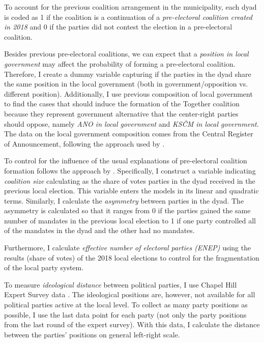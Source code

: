 \documentclass[fignum,12pt,titlepage]{article}
\begin{document}
To account for the previous coalition arrangement in the municipality, each dyad is coded as 1 if the coalition is a continuation of a \emph{pre-electoral coalition created in 2018} and 0 if the parties did not contest the election in a pre-electoral coalition. 

Besides previous pre-electoral coalitions, we can expect that a \emph{position in local government} may affect the probability of forming a pre-electoral coalition. Therefore, I create a dummy variable capturing if the parties in the dyad share the same position in the local government (both in government/opposition vs. different position). Additionally, I use previous composition of local government to find the cases that should induce the formation of the Together coalition because they represent government alternative that the center-right parties should oppose, namely \emph{ANO in local government} and \emph{KSČM in local government}. 
The data on the local government composition comes from the Central Register of Announcement, following the approach used by \textcite{skvrnak2021}.

To control for the influence of the usual explanations of pre-electoral coalition formation follows the approach by \textcite{golder2006}. Specifically, I construct a variable indicating \emph{coalition size} calculating as the share of votes parties in the dyad received in the previous local election. This variable enters the models in its linear and quadratic terms.
Similarly, I calculate the \emph{asymmetry} between parties in the dyad. The asymmetry is calculated so that it ranges from 0 if the parties gained the same number of mandates in the previous local election to 1 if one party controlled all of the mandates in the dyad and the other had no mandates.

Furthermore, I calculate \emph{effective number of electoral parties (ENEP)} using the results (share of votes) of the 2018 local elections to control for the fragmentation of the local party system. 

To measure \emph{ideological distance} between political parties, I use Chapel Hill Expert Survey data \parencite{jolly2022}. The ideological positions are, however, not available for all political parties active at the local level. To collect as many party positions as possible, I use the last data point for each party (not only the party positions from the last round of the expert survey). With this data, I calculate the distance between the parties' positions on general left-right scale. 
\end{document}

